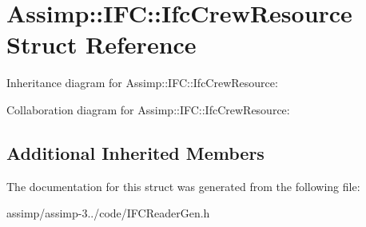\hypertarget{struct_assimp_1_1_i_f_c_1_1_ifc_crew_resource}{\section{Assimp\+:\+:I\+F\+C\+:\+:Ifc\+Crew\+Resource Struct Reference}
\label{struct_assimp_1_1_i_f_c_1_1_ifc_crew_resource}
}


Inheritance diagram for Assimp\+:\+:I\+F\+C\+:\+:Ifc\+Crew\+Resource\+:


Collaboration diagram for Assimp\+:\+:I\+F\+C\+:\+:Ifc\+Crew\+Resource\+:
\subsection*{Additional Inherited Members}


The documentation for this struct was generated from the following file\+:\begin{DoxyCompactItemize}
\item 
assimp/assimp-\/3../code/I\+F\+C\+Reader\+Gen.\+h\end{DoxyCompactItemize}
